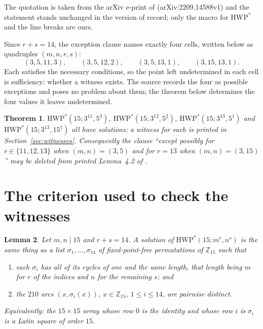 \documentclass[11pt]{amsart}
\newtheorem{theorem}{Theorem}
\newtheorem{lemma}[theorem]{Lemma}
\theoremstyle{remark}
\newcommand{\HWP}{\mathrm{HWP}^{*}}
\newcommand{\Zfif}{\mathbb{Z}_{15}}
\begin{document}
The quotation is taken from the arXiv e-print of \cite{YOO} (arXiv:2209.14588v1)
and the statement stands unchanged in the version of record; only the macro for
$\HWP$ and the line breaks are ours.

Since $r+s=14$, the exception clause names exactly four cells, written below as
quadruples $(m,n,r,s)$:
\[
  (3,5,11,3), \qquad (3,5,12,2), \qquad (3,5,13,1), \qquad (3,15,13,1).
\]
Each satisfies the necessary conditions, so the point left undetermined in each
cell is sufficiency: whether a witness exists. The source records the four as
possible exceptions and poses no problem about them; the theorem below
determines the four values it leaves undetermined.

\begin{theorem}\label{thm:main}
$\HWP(15; 3^{11}, 5^{3})$, $\HWP(15; 3^{12}, 5^{2})$, $\HWP(15; 3^{13}, 5^{1})$
and $\HWP(15; 3^{13}, 15^{1})$ all have solutions; a witness for each is printed
in Section~\textup{\ref{sec:witnesses}}. Consequently the clause ``except
possibly for $r\in\{11,12,13\}$ when $(m,n)=(3,5)$ and for $r=13$ when
$(m,n)=(3,15)$'' may be deleted from printed Lemma~\textup{4.2} of
\textup{\cite{YOO}}.
\end{theorem}

\section{The criterion used to check the witnesses}

\begin{lemma}\label{lem:crit}
Let $m,n \mid 15$ and $r+s=14$. A solution of $\HWP(15; m^{r}, n^{s})$ is the
same thing as a list $\sigma_{1},\dots,\sigma_{14}$ of fixed-point-free
permutations of $\Zfif$ such that
\begin{enumerate}
\item[(i)] each $\sigma_{i}$ has all of its cycles of one and the same length,
that length being $m$ for $r$ of the indices and $n$ for the remaining $s$; and
\item[(ii)] the $210$ arcs $(x,\sigma_{i}(x))$, $x \in \Zfif$,
$1 \le i \le 14$, are pairwise distinct.
\end{enumerate}
Equivalently: the $15\times 15$ array whose row $0$ is the identity and whose
row $i$ is $\sigma_{i}$ is a Latin square of order $15$.
\end{lemma}
\end{document}
